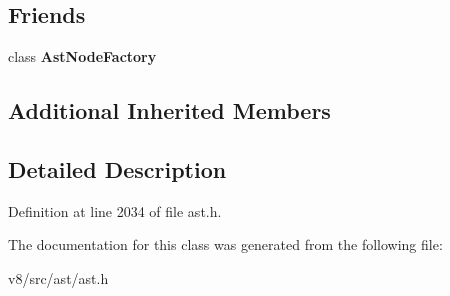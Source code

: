 \subsection*{Friends}
\begin{DoxyCompactItemize}
\item 
\mbox{\label{classv8_1_1internal_1_1CountOperation_a8d587c8ad3515ff6433eb83c578e795f}} 
class {\bfseries Ast\+Node\+Factory}
\end{DoxyCompactItemize}
\subsection*{Additional Inherited Members}


\subsection{Detailed Description}


Definition at line 2034 of file ast.\+h.



The documentation for this class was generated from the following file\+:\begin{DoxyCompactItemize}
\item 
v8/src/ast/ast.\+h\end{DoxyCompactItemize}
